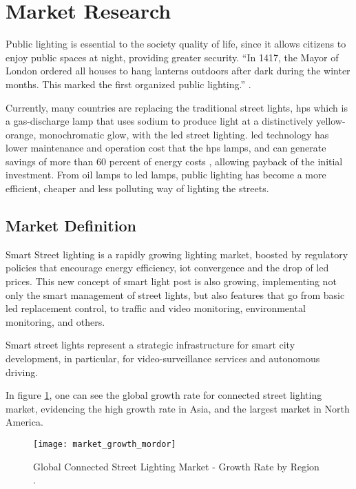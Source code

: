 \section{Market Research}
Public lighting is essential to the society quality of life, since it allows citizens to enjoy public spaces at night, providing greater security. “In 1417, the Mayor of London ordered all houses to hang lanterns outdoors after dark during the winter months. This marked the first organized public lighting.”  \cite{street_lighting_history}.

Currently, many countries are replacing the traditional street lights, \ac{hps} which is a gas-discharge lamp that uses sodium to produce light at a distinctively yellow-orange, monochromatic glow, with the \ac{led} street lighting. \ac{led} technology has lower maintenance and operation cost that the \ac{hps} lamps, and can generate savings of more than 60 percent of energy costs \cite{light_pollution}, allowing payback of the initial investment. From oil lamps to \ac{led} lamps, public lighting has become a more efficient, cheaper and less polluting way of lighting the streets.

\subsection{Market Definition}
Smart Street lighting is a rapidly growing lighting market, boosted by regulatory policies that encourage energy efficiency, \ac{iot} convergence and the drop of \ac{led} prices. This new concept of smart light post is also growing, implementing not only the smart management of street lights, but also features that go from basic \ac{led} replacement control, to traffic and video monitoring, environmental monitoring, and others.

Smart street lights represent a strategic infrastructure for smart city development, in particular, for video-surveillance services and autonomous driving. \cite{market_growth_2}

In figure \ref{fig:market_growth}, one can see the global growth rate for connected street lighting market, evidencing the high growth rate in Asia, and the largest market in North America.

\begin{figure}[ht]
	\centering
	\texttt{[image: market\_growth\_mordor]}
	\caption{Global Connected Street Lighting Market - Growth Rate by Region \cite{market_growth}.}
	\label{fig:market_growth}
\end{figure}

